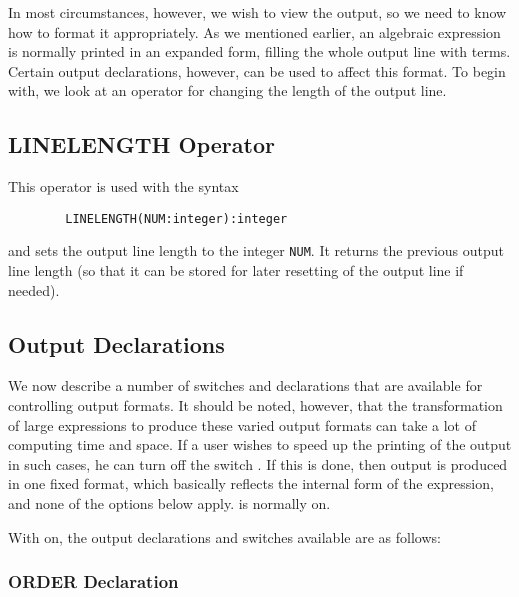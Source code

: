 In most circumstances, however, we wish to view the output, so we need to
know how to format it appropriately.  As we mentioned earlier, an
algebraic expression is normally printed in an expanded form, filling the
whole output line with terms.  Certain output declarations, however, can be used to affect this format.  To begin with,
we look at an operator for changing the length of the output line.

\subsection{LINELENGTH Operator}
\hypertarget{operator:LINELENGTH}{}

This operator is used with the syntax
\begin{verbatim}
        LINELENGTH(NUM:integer):integer
\end{verbatim}
and sets the output line length to the integer \texttt{NUM}. It returns the
previous output line length (so that it can be stored for later resetting
of the output line if needed).

\subsection{Output Declarations}
\hypertarget{switch:PRI}{}

We now describe a number of switches and declarations that are available
for controlling output formats. It should be noted, however, that the
transformation of large expressions to produce these varied output formats
can take a lot of computing time and space. If a user wishes to speed up
the printing of the output in such cases, he can turn off the switch
. If this is done, then output is produced in one fixed
format, which basically reflects the internal form of the expression, and
none of the options below apply.  is normally on.

With  on, the output declarations
and switches available are as follows:

\subsubsection{ORDER Declaration}
\hypertarget{command:ORDER}{}

